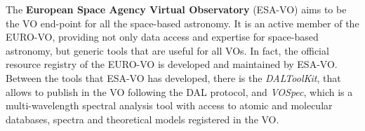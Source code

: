 The \textbf{European Space Agency Virtual Observatory} (ESA-VO) aims to be the
VO end-point for all the space-based astronomy.  It is an active member of the
EURO-VO, providing not only data access and expertise for space-based astronomy,
but generic tools that are useful for all VOs. In fact, the official resource
registry of the EURO-VO is developed and maintained by ESA-VO. 
Between the tools that ESA-VO has developed, there is the \emph{DALToolKit},
that allows to publish in the VO following the DAL protocol, and \emph{VOSpec},
which is a multi-wavelength spectral analysis tool with access to atomic and
molecular databases, spectra and theoretical models registered in the VO.

